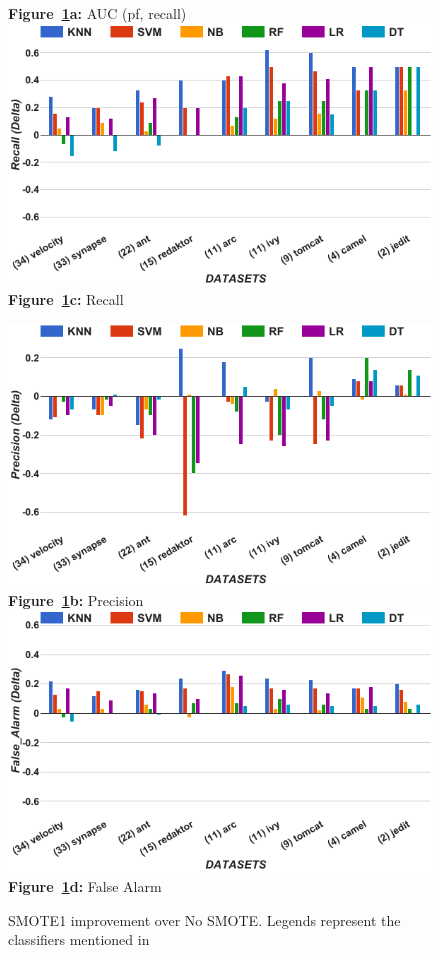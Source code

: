 \begin{figure}[!t]
\begin{minipage}{.5\linewidth}
  {\bf Figure~\ref{fig:untuned}a:} AUC (pf, recall)
        \includegraphics[width=.95\linewidth]{./fig/Recall_untuned.png}
  {\bf Figure~\ref{fig:untuned}c:} Recall
    \end{minipage}%
\begin{minipage}{.5\linewidth}
        \centering
        \includegraphics[width=.95\linewidth]{./fig/prec_untuned.png}
  {\bf Figure~\ref{fig:untuned}b:} Precision
        \includegraphics[width=.95\linewidth]{./fig/pf_untuned.png}
  {\bf Figure~\ref{fig:untuned}d:} False Alarm
    \end{minipage}%
    \caption{SMOTE1 improvement over No SMOTE. Legends represent the classifiers mentioned in }
    \label{fig:untuned}
\end{figure}

